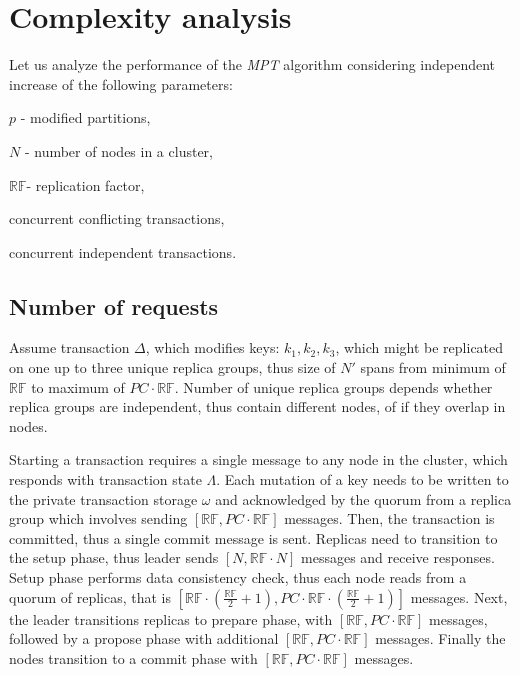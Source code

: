 \documentclass[runningheads,a4paper]{llncs}
\newcommand{\nodesTx}{$\mathit{N'}$\xspace}
\newcommand{\transaction}{$\Delta$\xspace}
\newcommand{\txState}{$\Lambda$\xspace}
\newcommand{\txStorage}{$\omega$\xspace}
\newcommand{\mpt}{\emph{MPT}\xspace}
\newcommand{\RFalone}{$\mathbb{RF}$\xspace}
\newcommand{\RFaloneInMath}{\mathbb{RF}}
\begin{document}
\section{Complexity analysis}

Let us analyze the performance of the \mpt algorithm considering independent increase of the following parameters: 
\begin{enumerate*}[label=\alph*)]
\item $p$ - modified partitions,
\item $N$ - number of nodes in a cluster,
\item \RFalone - replication factor,
\item concurrent conflicting transactions,
\item concurrent independent transactions.
\end{enumerate*}

\subsection{Number of requests}
Assume transaction \transaction, which modifies keys: $k_{1}, k_{2}, k_{3}$, which might be replicated on one up to three unique replica groups, thus size of \nodesTx spans from minimum of \RFalone to maximum of $PC\cdot\RFaloneInMath$. Number of unique replica groups depends whether replica groups are independent, thus contain different nodes, of if they overlap in nodes.

Starting a transaction requires a single message to any node in the cluster, which responds with transaction state \txState. Each mutation of a key needs to be written to the private transaction storage \txStorage and acknowledged by the quorum from a replica group which involves sending $[\RFaloneInMath,PC\cdot\RFaloneInMath]$ messages. Then, the transaction is committed, thus a single commit message is sent. Replicas need to transition to the setup phase, thus leader sends $[N,\RFaloneInMath\cdot N]$ messages and receive responses. Setup phase performs data consistency check, thus each node reads from a quorum of replicas, that is $[\RFaloneInMath \cdot (\frac{\RFaloneInMath}{2} + 1), PC\cdot\RFaloneInMath \cdot (\frac{\RFaloneInMath}{2} + 1)]$ messages. Next, the leader transitions replicas to prepare phase, with $[\RFaloneInMath,PC\cdot\RFaloneInMath]$ messages, followed by a propose phase with additional $[\RFaloneInMath,PC\cdot\RFaloneInMath]$ messages. Finally the nodes transition to a commit phase with $[\RFaloneInMath,PC\cdot\RFaloneInMath]$ messages.
\end{document}

